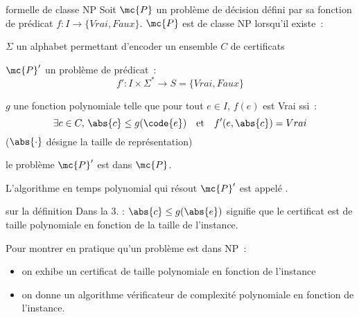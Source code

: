 \begin{adjustwidth}{-3cm}{-3cm}
\begin{definition}{}{formelle de classe NP}
    Soit $\mc{P}$ un problème de décision défini par sa fonction de prédicat $f: I \to \{Vrai, Faux\}$. $\mc{P}$ est de classe NP lorsqu'il existe~:
    \begin{enumeratebf}
        \item $\Sigma$ un alphabet permettant d'encoder un ensemble $C$ de certificats
        \item $\mc{P}'$ un problème de prédicat~:
        $$f': I\times \Sigma^* \to  S=\{Vrai, Faux\}$$
        \item $g$ une fonction polynomiale telle que pour tout $e\in I$, $f(e)$ est Vrai ssi~:
        $$\exists c \in C,\, \abs{c} \leq g(\code{e}) \quad \text{et} \quad f'(e,\abs{c}) = Vrai$$
        ($\abs{\cdot}$ désigne la taille de représentation)
        \item le problème $\mc{P}'$ est dans $\mc{P}$.
    \end{enumeratebf}
    L'algorithme en temps polynomial qui résout $\mc{P}'$ est appelé .
\end{definition}

\begin{remarque}{}{sur la définition}
    Dans la 3. : $\abs{c} \leq g(\abs{e})$ signifie que le certificat est de taille polynomiale en fonction de la taille de l'instance.
\end{remarque}

\begin{remarque}{}{}
    Pour montrer en pratique qu'un problème est dans NP~:
    \begin{itemize}
        \item on exhibe un certificat de taille polynomiale en fonction de l'instance
        \item on donne un algorithme vérificateur de complexité polynomiale en fonction de l'instance.
    \end{itemize}
\end{remarque}


\end{adjustwidth}
